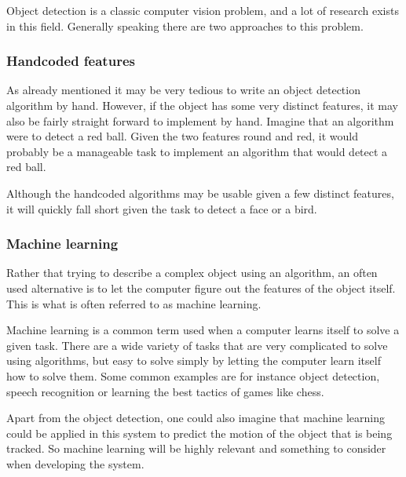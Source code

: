 Object detection is a classic computer vision problem, and a lot of research exists in this field.
Generally speaking there are two approaches to this problem.

\subsubsection{Handcoded features}
As already mentioned it may be very tedious to write an object detection algorithm by hand.
However, if the object has some very distinct features, it may also be fairly straight forward to implement by hand.
Imagine that an algorithm were to detect a red ball. 
Given the two features round and red, it would probably be a manageable task to implement an algorithm that would detect a red ball.

Although the handcoded algorithms may be usable given a few distinct features, it will quickly fall short given the task to detect a face or a bird.

\subsubsection{Machine learning}
Rather that trying to describe a complex object using an algorithm, an often used alternative is to let the computer figure out the features of the object itself.
This is what is often referred to as machine learning.

Machine learning is a common term used when a computer learns itself to solve a given task\cite{MachineLearningWiki}.
There are a wide variety of tasks that are very complicated to solve using algorithms, but easy to solve simply by letting the computer learn itself how to solve them. 
Some common examples are for instance object detection, speech recognition or learning the best tactics of games like chess.

Apart from the object detection, one could also imagine that machine learning could be applied in this system to predict the motion of the object that is being tracked.
So machine learning will be highly relevant and something to consider when developing the system.